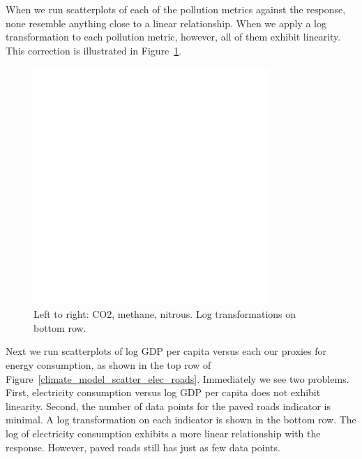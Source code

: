 \documentclass[12pt]{article}
\begin{document}
When we run scatterplots of each of the pollution metrics against the response, none resemble anything close to a linear relationship. When we apply a log transformation to each pollution metric, however, all of them exhibit linearity. This correction is illustrated in Figure~\ref{climate_model_scatter_pollution}.

\begin{figure}[h!]
  \centering
  \includegraphics[width=0.8\textwidth]{images/climate_model_scatter_pollution}
  \caption{\label{climate_model_scatter_pollution}Left to right: CO2, methane, nitrous. Log transformations on bottom row.}
\end{figure}

Next we run scatterplots of log GDP per capita versus each our proxies for energy consumption, as shown in the top row of Figure~\ref{climate_model_scatter_elec_roads}. Immediately we see two problems. First, electricity consumption versus log GDP per capita does not exhibit linearity. Second, the number of data points for the paved roads indicator is minimal. A log transformation on each indicator is shown in the bottom row. The log of electricity consumption exhibits a more linear relationship with the response. However, paved roads still has just as few data points.
\end{document}
